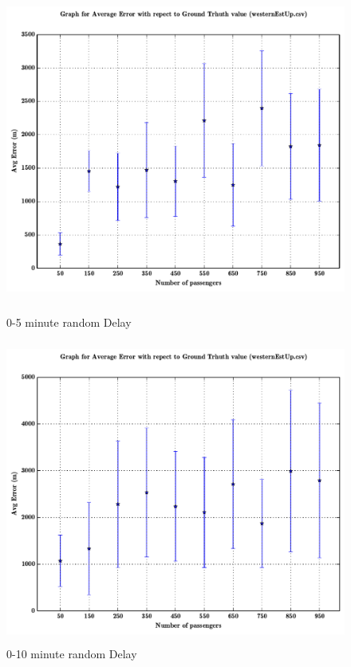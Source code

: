 \documentclass[a4paper,12pt]{report}
\begin{document}
\begin{figure}[h!]

\centering
\includegraphics[height=10cm,width=17cm]{04_5minDelay.pdf}
\caption{0-5 minute random Delay}

\centering
\includegraphics[height=10cm,width=17cm]{05_10minDelay.pdf}
\caption{0-10 minute random Delay}
\end{figure}
\end{document}
